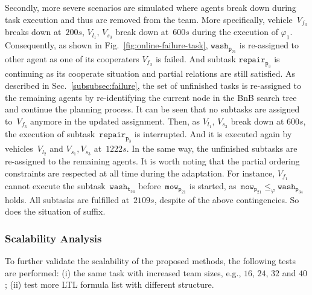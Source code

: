 Secondly, more severe scenarios are simulated where agents break down
during task execution and thus are removed from the team.
More specifically, vehicle~$V_{f_3}$ breaks down at~$200s$, $V_{l_1},\, V_{s_3}$ break
down at~$600s$ during the execution of $\varphi_1$.
Consequently, as shown in Fig.~\ref{fig:online-failure-task}, $\texttt{wash}_{\texttt{p}_{21}}$
is re-assigned to other agent as one of its cooperaters $V_{f_3}$ is failed. And subtask 
$\texttt{repair}_{\texttt{p}_{3}}$ is continuing as its cooperate situation and partial relations 
are still satisfied. As described in Sec.~\ref{subsubsec:failure},
the set of unfinished tasks is re-assigned to the remaining agents by re-identifying
the current node in the BnB search tree and continue the planning process.
It can be seen that no subtasks are assigned to~$V_{f_3}$ anymore in the updated assignment.
Then, as $V_{l_1},\, V_{s_3}$ break down at $600s$, the execution of subtask~$\texttt{repair}_{\texttt{p}_{3}}$ 
is interrupted. And it is executed again by vehicles~$V_{l_2}$ and $V_{s_1},V_{s_3}$ at~$1222s$.
In the same way, the unfinished subtasks are re-assigned to the remaining agents.
It is worth noting that the partial ordering constraints are respected at all
time during the adaptation.
For instance, $V_{f_1}$ cannot execute the subtask~$\texttt{wash}_{\texttt{t}_{34}}$
before~$\texttt{mow}_{\texttt{p}_{21}}$ is started,
as~$\texttt{mow}_{\texttt{p}_{21}}\leq_\varphi\texttt{wash}_{\texttt{p}_{34}}  $ holds.
All subtasks are fulfilled at~$2109s$, despite of the above contingencies.
So does the situation of suffix.


\subsubsection{Scalability Analysis}\label{subsubsec:scalable}
To further validate the scalability of the proposed methods,
the following tests are performed:
(i) the same task with increased team sizes,
e.g., $16$, $24$, $32$ and $40$;
(ii) test more LTL formula list with different structure. 

